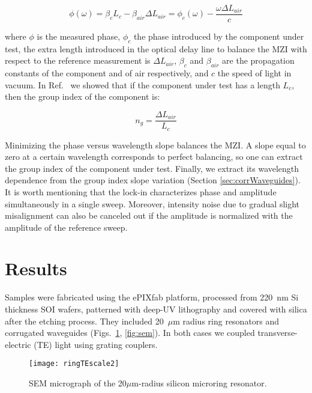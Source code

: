 \begin{equation}
  \phi(\omega)= \beta_c L_c - \beta_{air} \Delta L_{air} =\phi_{c}(\omega)-\frac{\omega\Delta L_{air}}{c}
  \label{eq:response}
\end{equation}

where $\phi$ is the measured phase, $\phi_{c}$ the phase introduced by the component under test, the extra length introduced in the optical delay line to balance the MZI with respect to the reference measurement is $\Delta L_{air}$, $\beta_c$ and $\beta_{air}$ are the propagation constants of the component and of air respectively, and $c$ the speed of light in vacuum.
In Ref.~\cite{Mas2012} we showed that if the component under test has a length $L_{c}$, then the group index of the component is:

\begin{equation}
  n_{g} = \frac{\Delta L_{air}}{L_{c}}
  \label{eq:group_index_pathBalancing}
\end{equation}

Minimizing the phase versus wavelength slope balances the MZI.
A slope equal to zero at a certain wavelength corresponds to perfect balancing, so one can extract the group index of the component under test.
Finally, we extract its wavelength dependence from the group index slope variation (Section \ref{sec:corrWaveguides}).
It is worth mentioning that the lock-in characterizes phase and amplitude simultaneously in a single sweep.
Moreover, intensity noise due to gradual slight misalignment can also be canceled out if the amplitude is normalized with the amplitude of the reference sweep.

\section{Results}
Samples were fabricated using the ePIXfab platform, processed from 220~nm Si thickness SOI wafers, patterned with deep-UV lithography and covered with silica after the etching process.
They included 20~$\mu$m radius ring resonators and corrugated waveguides (Figs.~\ref{fig:semRingPaperRings}, \ref{fig:sem}).
In both cases we coupled transverse-electric (TE) light using grating couplers.

\begin{figure}[htb]
    \centering
    \texttt{[image: ringTEscale2]}
    \caption{SEM micrograph of the 20$\mu$m-radius silicon microring resonator.}
    \label{fig:semRingPaperRings}
\end{figure}



